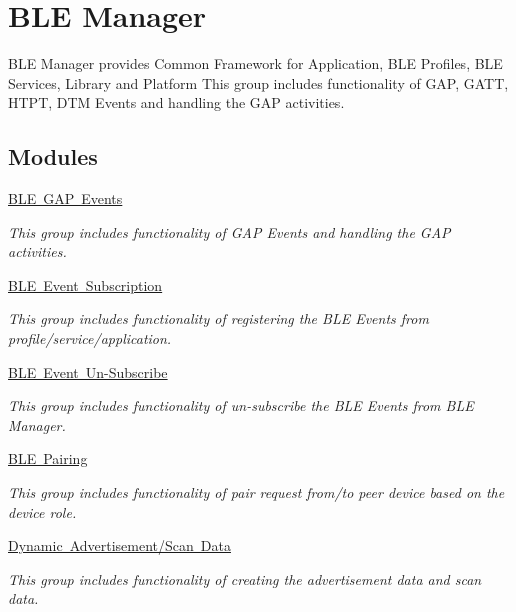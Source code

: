\hypertarget{group__ble__manager}{}\section{B\+LE Manager}
\label{group__ble__manager}


B\+LE Manager provides Common Framework for Application, B\+LE Profiles, B\+LE Services, Library and Platform This group includes functionality of G\+AP, G\+A\+TT, H\+T\+PT, D\+TM Events and handling the G\+AP activities.  


\subsection*{Modules}
\begin{DoxyCompactItemize}
\item 
\mbox{\hyperlink{group__ble__manager__gap__event}{B\+L\+E G\+A\+P Events}}
\begin{DoxyCompactList}\small\item\em This group includes functionality of G\+AP Events and handling the G\+AP activities. \end{DoxyCompactList}\item 
\mbox{\hyperlink{group__ble__manager__event__subscription}{B\+L\+E Event Subscription}}
\begin{DoxyCompactList}\small\item\em This group includes functionality of registering the B\+LE Events from profile/service/application. \end{DoxyCompactList}\item 
\mbox{\hyperlink{group__ble__manager__event__unsubscribe}{B\+L\+E Event Un-\/\+Subscribe}}
\begin{DoxyCompactList}\small\item\em This group includes functionality of un-\/subscribe the B\+LE Events from B\+LE Manager. \end{DoxyCompactList}\item 
\mbox{\hyperlink{group__ble__manager__pairing}{B\+L\+E Pairing}}
\begin{DoxyCompactList}\small\item\em This group includes functionality of pair request from/to peer device based on the device role. \end{DoxyCompactList}\item 
\mbox{\hyperlink{group__ble__manager__advertisement__structure}{Dynamic Advertisement/\+Scan Data}}
\begin{DoxyCompactList}\small\item\em This group includes functionality of creating the advertisement data and scan data. \end{DoxyCompactList}\item 

\end{DoxyCompactItemize}
